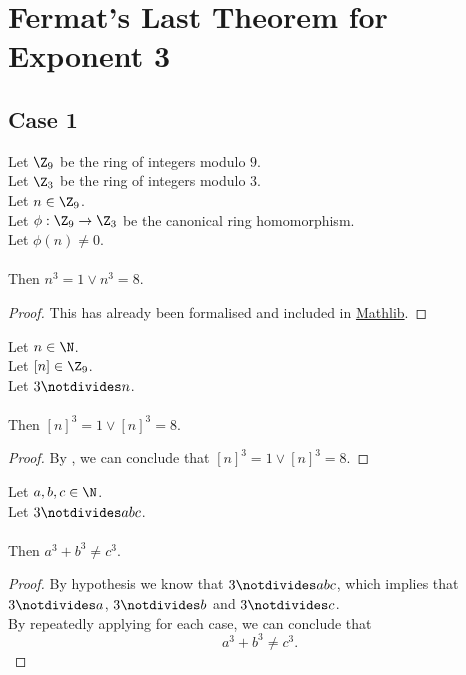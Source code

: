 
\chapter{Fermat's Last Theorem for Exponent 3}

\section{Case 1}

\begin{lemma}
  \label{lmm:cube_of_castHom_ne_zero}
  \leanok
  Let $\Z_9$ be the ring of integers modulo $9$. \\
  Let $\Z_3$ be the ring of integers modulo $3$. \\
  Let $n \in \Z_9$. \\
  Let $\phi : \Z_9 \to \Z_3$ be the canonical ring homomorphism. \\
  Let $\phi(n) \neq 0$. \\ \\
  Then $n^3=1 \lor n^3=8$.
\end{lemma}
\begin{proof}
  \leanok
  This has already been formalised and included in \href{https://pitmonticone.github.io/FLT3/docs/FLT3/Mathlib/NumberTheory/FLT/Three.html#cube_of_castHom_ne_zero}{Mathlib}.
\end{proof}

\begin{lemma}
  \label{lmm:cube_of_not_dvd}
  \leanok
  Let $n \in \N$. \\
  Let $\left[n \right] \in \Z_9$. \\
  Let $3 \notdivides n$. \\ \\
  Then $\left[n \right]^3 = 1 \lor \left[n \right]^3 = 8$.
\end{lemma}
\begin{proof}
  \leanok
  By , we can conclude that $\left[n \right]^3 = 1 \lor \left[n \right]^3 = 8$.
\end{proof}

\begin{theorem}
    \label{thm:fermatLastTheoremThree_case_1}
    \leanok
    Let $a, b, c \in \N$. \\
    Let $3 \notdivides abc$. \\\\
    Then $a ^ 3 + b ^ 3 \neq c ^ 3$.
\end{theorem}
\begin{proof}
  \leanok
  By hypothesis we know that $3 \notdivides abc$, which implies that $3 \notdivides a$, $3 \notdivides b$ and $3 \notdivides c$. \\
  By repeatedly applying  for each case,
  we can conclude that $$a ^ 3 + b ^ 3 \neq c ^ 3.$$
\end{proof}

